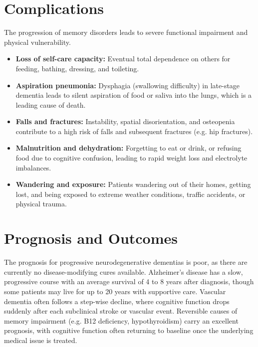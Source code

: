 \section*{Complications}
The progression of memory disorders leads to severe functional impairment and physical vulnerability.
\begin{itemize}
    \item \textbf{Loss of self-care capacity:} Eventual total dependence on others for feeding, bathing, dressing, and toileting.
    \item \textbf{Aspiration pneumonia:} Dysphagia (swallowing difficulty) in late-stage dementia leads to silent aspiration of food or saliva into the lungs, which is a leading cause of death.
    \item \textbf{Falls and fractures:} Instability, spatial disorientation, and osteopenia contribute to a high risk of falls and subsequent fractures (e.g. hip fractures).
    \item \textbf{Malnutrition and dehydration:} Forgetting to eat or drink, or refusing food due to cognitive confusion, leading to rapid weight loss and electrolyte imbalances.
    \item \textbf{Wandering and exposure:} Patients wandering out of their homes, getting lost, and being exposed to extreme weather conditions, traffic accidents, or physical trauma.
\end{itemize}

\section*{Prognosis and Outcomes}
The prognosis for progressive neurodegenerative dementias is poor, as there are currently no disease-modifying cures available. Alzheimer's disease has a slow, progressive course with an average survival of 4 to 8 years after diagnosis, though some patients may live for up to 20 years with supportive care. Vascular dementia often follows a step-wise decline, where cognitive function drops suddenly after each subclinical stroke or vascular event. Reversible causes of memory impairment (e.g. B12 deficiency, hypothyroidism) carry an excellent prognosis, with cognitive function often returning to baseline once the underlying medical issue is treated.

